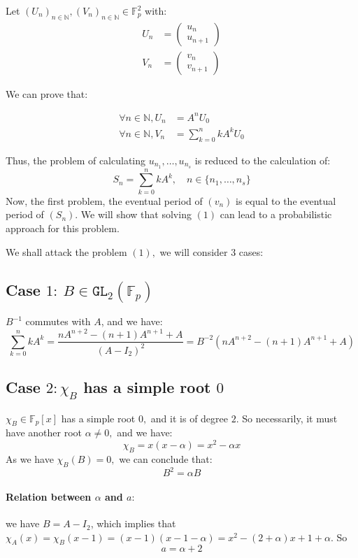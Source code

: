 \documentclass[]{article}
\begin{document}
Let $(U_n)_{n\in\mathbb{N}},(V_n)_{n\in\mathbb{N}}\in\mathbb{F}_p^2$ with:
\begin{align*}
	U_n&= \begin{pmatrix}
		u_n\\ u_{n+1}
	\end{pmatrix}\\
V_n&= \begin{pmatrix}
	v_n\\ v_{n+1}
\end{pmatrix}
\end{align*}

We can prove that:

\begin{align*}
	\forall n\in\mathbb{N}, U_n&=A^nU_0\\
		\forall n\in\mathbb{N}, V_n&=\sum_{k=0}^nkA^kU_0
\end{align*}

Thus, the problem of calculating $u_{n_1},\dots,u_{n_s}$ is reduced to the calculation of:
\begin{equation}\tag{1}
\boxed{S_n=\sum_{k=0}^n kA^k,\quad n\in\{n_1,\dots,n_s\}} 
\end{equation}
Now, the first problem, the eventual period of $(v_n)$ is equal to the eventual period of $(S_n).$ We will show that solving $(1)$ can lead to a probabilistic approach for this problem.

We shall attack the problem $(1),$ we will consider $3$ cases:
\subsection{Case $1: \ B\in\mathtt{GL}_2(\mathbb{F}_p)$}
$B^{-1}$ commutes with $A$, and we have:
$$
	\boxed{\sum_{k=0}^n kA^k= \frac{nA^{n+2}-(n+1)A^{n+1}+A}{(A-I_2)^2}=B^{-2}\left(nA^{n+2}-(n+1)A^{n+1}+A\right)}
$$
\subsection{Case $2: \chi_B$ has a simple root $0$}
$\chi_B\in\mathbb{F}_p[x]$ has a simple root $0,$ and it is of degree $2$.
\newline
So necessarily, it must have another root $\alpha\neq 0,$ and we have:
$$
\chi_B=x(x-\alpha)=x^2-\alpha x
$$ 
As we have $\chi_B(B)=0,$ we can conclude that:
$$
B^2=\alpha B
$$

\paragraph{Relation between $\alpha$ and $a:$} we have $B=A-I_2$, which implies that $\chi_A(x)=\chi_B(x-1)=(x-1)(x-1-\alpha)=x^2-(2+\alpha)x+1+\alpha$. So
$$
a=\alpha+2
$$
\end{document}
